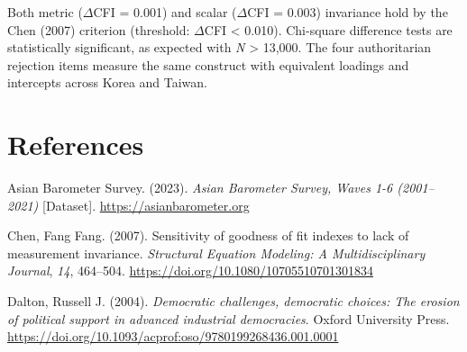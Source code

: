 \documentclass[
  12pt,
  letterpaper]{article}
\newlength{\cslhangindent}
\newenvironment{CSLReferences}[2] %
 {\begin{list}{}{%
  \setlength{\itemindent}{0pt}
  \setlength{\leftmargin}{0pt}
  \setlength{\parsep}{0pt}
  \ifodd #1
   \setlength{\leftmargin}{\cslhangindent}
   \setlength{\itemindent}{-1\cslhangindent}
  \fi
  \setlength{\itemsep}{#2\baselineskip}}}
 {\end{list}}
\begin{document}
Both metric (\(\Delta\)CFI = 0.001) and scalar (\(\Delta\)CFI = 0.003)
invariance hold by the Chen (2007) criterion (threshold: \(\Delta\)CFI
\textless{} 0.010). Chi-square difference tests are statistically
significant, as expected with \emph{N} \textgreater{} 13,000. The four
authoritarian rejection items measure the same construct with equivalent
loadings and intercepts across Korea and Taiwan.

\section*{References}\label{references}

\label{refs}
\begin{CSLReferences}{1}{0}
Asian Barometer Survey. (2023). \emph{{Asian Barometer Survey, Waves 1-6
(2001--2021)}} {[}Dataset{]}. \url{https://asianbarometer.org}

Chen, Fang Fang. (2007). {Sensitivity of goodness of fit indexes to lack
of measurement invariance}. \emph{Structural Equation Modeling: A
Multidisciplinary Journal}, \emph{14}, 464--504.
\url{https://doi.org/10.1080/10705510701301834}

Dalton, Russell J. (2004). \emph{{Democratic challenges, democratic
choices: The erosion of political support in advanced industrial
democracies}}. Oxford University Press.
\url{https://doi.org/10.1093/acprof:oso/9780199268436.001.0001}

\end{CSLReferences}
\end{document}
